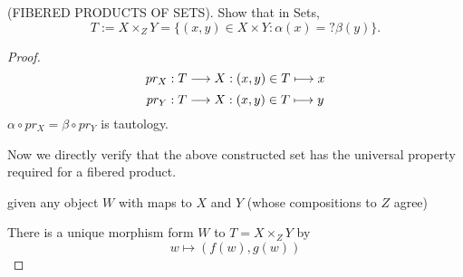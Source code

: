 \begin{exr}
(FIBERED PRODUCTS OF SETS). Show that in Sets,
$$
T:=X\times_Z Y=\{(x,y)\in X\times Y : \alpha(x)=?\beta(y)\}.$$
\end{exr}
\begin{proof}
$$
pr_X:T\longrightarrow X:(x,y)\in T\longmapsto x
$$
$$
pr_Y:T\longrightarrow X:(x,y)\in T\longmapsto y
$$
$\alpha\circ pr_X=\beta\circ pr_Y$ is tautology.

Now we directly verify that the above constructed set has the universal property required for a fibered product.
\begin{center}
\end{center}
given any object $W $ with maps to $X$ and $Y$ (whose compositions to $Z$ agree)

There is a unique morphism form $W$ to $T=X\times_Z Y$ by 
$$
w\longmapsto (f(w), g(w))
$$
\end{proof}

